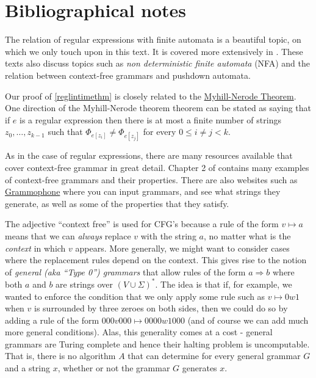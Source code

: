 \section{Bibliographical notes}\label{Bibliographical-notes}

The relation of regular expressions with finite automata is a beautiful
topic, on which we only touch upon in this text. It is covered more
extensively in \cite{SipserBook, hopcroft , kozen1997automata,  }. These
texts also discuss topics such as \emph{non deterministic finite
automata} (NFA) and the relation between context-free grammars and
pushdown automata.

Our proof of \cref{reglintimethm} is closely related to the
\href{https://goo.gl/mnKVMP}{Myhill-Nerode Theorem}. One direction of
the Myhill-Nerode theorem theorem can be stated as saying that if \(e\)
is a regular expression then there is at most a finite number of strings
\(z_0,\ldots,z_{k-1}\) such that \(\Phi_{e[z_i]} \neq \Phi_{e[z_j]}\)
for every \(0 \leq i\neq j < k\).

As in the case of regular expressions, there are many resources
available that cover context-free grammar in great detail. Chapter 2 of
\cite{SipserBook} contains many examples of context-free grammars and
their properties. There are also websites such as
\href{https://mdaines.github.io/grammophone/}{Grammophone} where you can
input grammars, and see what strings they generate, as well as some of
the properties that they satisfy.

The adjective ``context free'' is used for CFG's because a rule of the
form \(v \mapsto a\) means that we can \emph{always} replace \(v\) with
the string \(a\), no matter what is the \emph{context} in which \(v\)
appears. More generally, we might want to consider cases where the
replacement rules depend on the context. This gives rise to the notion
of \emph{general (aka ``Type 0'') grammars} that allow rules of the form
\(a \Rightarrow b\) where both \(a\) and \(b\) are strings over
\((V \cup \Sigma)^*\). The idea is that if, for example, we wanted to
enforce the condition that we only apply some rule such as
\(v \mapsto 0w1\) when \(v\) is surrounded by three zeroes on both
sides, then we could do so by adding a rule of the form
\(000v000 \mapsto 0000w1000\) (and of course we can add much more
general conditions). Alas, this generality comes at a cost - general
grammars are Turing complete and hence their halting problem is
uncomputable. That is, there is no algorithm \(A\) that can determine
for every general grammar \(G\) and a string \(x\), whether or not the
grammar \(G\) generates \(x\).

